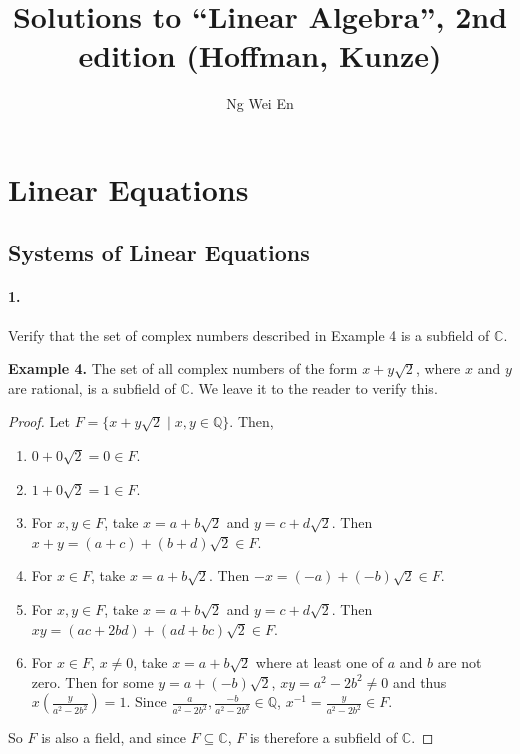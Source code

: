 \documentclass{article}
\title{Solutions to ``Linear Algebra'', 2nd edition (Hoffman, Kunze)}
\author{Ng Wei En}
\begin{document}
\maketitle
\tableofcontents
\newpage

\section{Linear Equations}

\setcounter{subsection}{1}
\subsection{Systems of Linear Equations}

\paragraph{1.} Verify that the set of complex numbers described in Example 4 is
a subfield of $\mathbb{C}$.

\begin{displayquote}
  \textbf{Example 4.} The set of all complex numbers of the form $x +
  y\sqrt{2}$, where $x$ and $y$ are rational, is a subfield of $\mathbb{C}$. We
  leave it to the reader to verify this.
\end{displayquote}

\begin{proof}
  Let $F = \{x + y\sqrt{2} \mid x, y \in \mathbb{Q}\}$. Then,
  \begin{enumerate}
    \item $0 + 0\sqrt{2} = 0 \in F$.
    \item $1 + 0\sqrt{2} = 1 \in F$.
    \item For $x, y \in F$, take $x = a + b\sqrt{2}$ and $y = c + d\sqrt{2}$.
      Then $x + y = (a + c) + (b + d)\sqrt{2} \in F$.
    \item For $x \in F$, take $x = a + b\sqrt{2}$. Then $-x = (-a) +
      (-b)\sqrt{2} \in F$.
    \item For $x, y \in F$, take $x = a + b\sqrt{2}$ and $y = c + d\sqrt{2}$.
      Then $xy = (ac + 2bd) + (ad + bc)\sqrt{2} \in F$.
    \item For $x \in F$, $x \neq 0$, take $x = a + b\sqrt{2}$ where at least one
      of $a$ and $b$ are not zero. Then for some $y = a + (-b)\sqrt{2}$, $xy = a^2
      - 2b^2 \neq 0$ and thus $x\left(\frac{y}{a^2 - 2b^2}\right) = 1$. Since
      $\frac{a}{a^2 - 2b^2}, \frac{-b}{a^2 - 2b^2} \in \mathbb{Q}$, $x^{-1} =
      \frac{y}{a^2 - 2b^2} \in F$.
  \end{enumerate}
  So $F$ is also a field, and since $F \subseteq \mathbb{C}$, $F$ is therefore a
  subfield of $\mathbb{C}$.
\end{proof}
\end{document}
